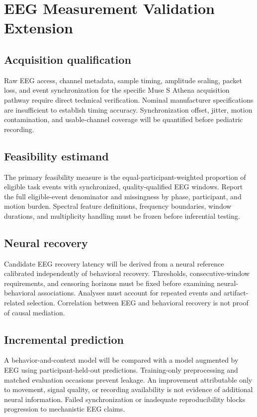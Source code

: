 \section{EEG Measurement Validation Extension}
\subsection{Acquisition qualification}
Raw EEG access, channel metadata, sample timing, amplitude scaling, packet loss, and event synchronization for the specific Muse S Athena acquisition pathway require direct technical verification. Nominal manufacturer specifications are insufficient to establish timing accuracy. Synchronization offset, jitter, motion contamination, and usable-channel coverage will be quantified before pediatric recording.

\subsection{Feasibility estimand}
The primary feasibility measure is the equal-participant-weighted proportion of eligible task events with synchronized, quality-qualified EEG windows. Report the full eligible-event denominator and missingness by phase, participant, and motion burden. Spectral feature definitions, frequency boundaries, window durations, and multiplicity handling must be frozen before inferential testing.

\subsection{Neural recovery}
Candidate EEG recovery latency will be derived from a neural reference calibrated independently of behavioral recovery. Thresholds, consecutive-window requirements, and censoring horizons must be fixed before examining neural-behavioral associations. Analyses must account for repeated events and artifact-related selection. Correlation between EEG and behavioral recovery is not proof of causal mediation.

\subsection{Incremental prediction}
A behavior-and-context model will be compared with a model augmented by EEG using participant-held-out predictions. Training-only preprocessing and matched evaluation occasions prevent leakage. An improvement attributable only to movement, signal quality, or recording availability is not evidence of additional neural information. Failed synchronization or inadequate reproducibility blocks progression to mechanistic EEG claims.